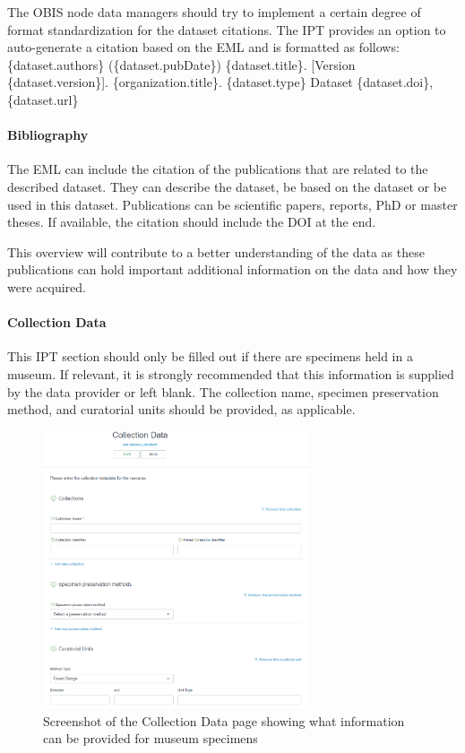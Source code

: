 \documentclass[
  letterpaper,
  DIV=11,
  numbers=noendperiod,
  oneside]{scrreprt}
\let\oldparagraph\paragraph
\renewcommand{\paragraph}[1]{\oldparagraph{#1}\mbox{}}
\begin{document}
The OBIS node data managers should try to implement a certain degree of
format standardization for the dataset citations. The IPT provides an
option to auto-generate a citation based on the EML and is formatted as
follows: \{dataset.authors\} (\{dataset.pubDate\}) \{dataset.title\}.
{[}Version \{dataset.version\}{]}. \{organization.title\}.
\{dataset.type\} Dataset \{dataset.doi\}, \{dataset.url\}

\hypertarget{bibliography}{%
\paragraph{Bibliography}\label{bibliography}}

The EML can include the citation of the publications that are related to
the described dataset. They can describe the dataset, be based on the
dataset or be used in this dataset. Publications can be scientific
papers, reports, PhD or master theses. If available, the citation should
include the DOI at the end.

This overview will contribute to a better understanding of the data as
these publications can hold important additional information on the data
and how they were acquired.

\hypertarget{collection-data}{%
\paragraph{Collection Data}\label{collection-data}}

This IPT section should only be filled out if there are specimens held
in a museum. If relevant, it is strongly recommended that this
information is supplied by the data provider or left blank. The
collection name, specimen preservation method, and curatorial units
should be provided, as applicable.

\begin{figure}

{\centering \includegraphics[width=0.7\textwidth,height=\textheight]{images/ipt-ss17-meta-collection.png}

}

\caption{Screenshot of the Collection Data page showing what information
can be provided for museum specimens}

\end{figure}
\end{document}
